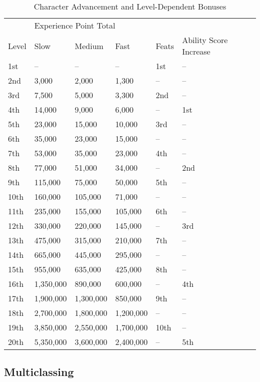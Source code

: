 \begin{table}[]
\sffamily
\caption{Character Advancement and Level-Dependent Bonuses}
\begin{tabular}{llllll}
      & \multicolumn{3}{l}{Experience Point Total} &       &                        \\
Level & Slow         & Medium       & Fast         & Feats & Ability Score Increase \\
1st  & --         & --         & --         & 1st  & --   \\
2nd  & 3,000     & 2,000     & 1,300     & --    & --   \\
3rd  & 7,500     & 5,000     & 3,300     & 2nd  & --   \\
4th  & 14,000    & 9,000     & 6,000     & --    & 1st \\
5th  & 23,000    & 15,000    & 10,000    & 3rd  & --   \\
6th  & 35,000    & 23,000    & 15,000    & --    & --   \\
7th  & 53,000    & 35,000    & 23,000    & 4th  & --   \\
8th  & 77,000    & 51,000    & 34,000    & --    & 2nd \\
9th  & 115,000   & 75,000    & 50,000    & 5th  & --   \\
10th & 160,000   & 105,000   & 71,000    & --    & --   \\
11th & 235,000   & 155,000   & 105,000   & 6th  & --   \\
12th & 330,000   & 220,000   & 145,000   & --    & 3rd \\
13th & 475,000   & 315,000   & 210,000   & 7th  & --   \\
14th & 665,000   & 445,000   & 295,000   & --    & --   \\
15th & 955,000   & 635,000   & 425,000   & 8th  & --   \\
16th & 1,350,000 & 890,000   & 600,000   & --    & 4th \\
17th & 1,900,000 & 1,300,000 & 850,000   & 9th  & --   \\
18th & 2,700,000 & 1,800,000 & 1,200,000 & --    & --   \\
19th & 3,850,000 & 2,550,000 & 1,700,000 & 10th & --   \\
20th & 5,350,000 & 3,600,000 & 2,400,000 & --    & 5th
\end{tabular}
\end{table}

				
\subsection{Multiclassing}

